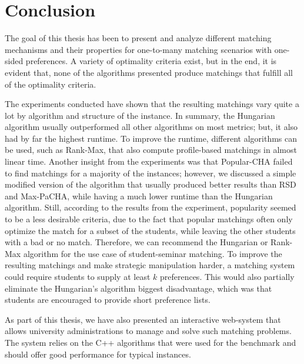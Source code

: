 \section{Conclusion}

The goal of this thesis has been to present and analyze different matching mechanisms and their properties for one-to-many matching scenarios with one-sided preferences. A variety of optimality criteria exist, but in the end, it is evident that, none of the algorithms presented produce matchings that fulfill all of the optimality criteria. 

The experiments conducted have shown that the resulting matchings vary quite a lot by algorithm and structure of the instance. In summary, the Hungarian algorithm usually outperformed all other algorithms on most metrics; but, it also had by far the highest runtime. To improve the runtime, different algorithms can be used, such as Rank-Max, that also compute profile-based matchings in almost linear time. Another insight from the experiments was that Popular-CHA failed to find matchings for a majority of the instances; however, we discussed a simple modified version of the algorithm that usually produced better results than RSD and Max-PaCHA, while having a much lower runtime than the Hungarian algorithm. Still, according to the results from the experiment, popularity seemed to be a less desirable criteria, due to the fact that popular matchings often only optimize the match for a subset of the students, while leaving the other students with a bad or no match. Therefore, we can recommend the Hungarian or Rank-Max algorithm for the use case of student-seminar matching. To improve the resulting matchings and make strategic manipulation harder, a matching system could require students to supply at least $k$ preferences. This would also partially eliminate the Hungarian's algorithm biggest disadvantage, which was that students are encouraged to provide short preference lists.

As part of this thesis, we have also presented an interactive web-system that allows university administrations to manage and solve such matching problems. The system relies on the C++ algorithms that were used for the benchmark and should offer good performance for typical instances.  